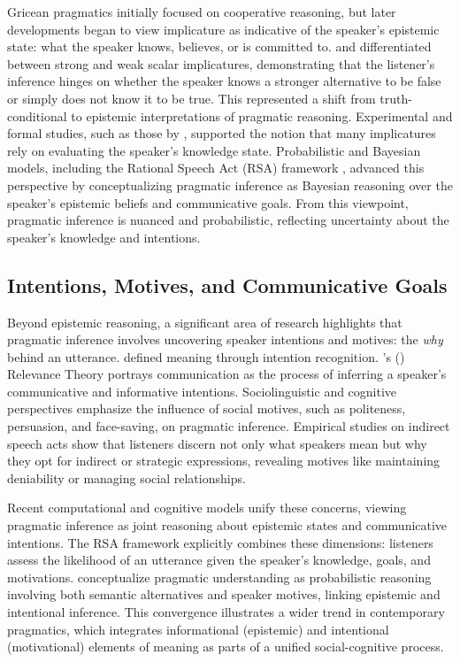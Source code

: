 \documentclass[12pt,a4paper]{article}
\begin{document}
Gricean pragmatics initially focused on cooperative reasoning, but later
developments began to view implicature as indicative of the speaker's epistemic
state: what the speaker knows, believes, or is committed to. \citet{sauerland2004}
and \citet{Spector2007} differentiated between strong and weak scalar
implicatures, demonstrating that the listener's inference hinges on whether the
speaker knows a stronger alternative to be false or simply does not know it to
be true. This represented a shift from truth-conditional to epistemic
interpretations of pragmatic reasoning. Experimental and formal studies, such as
those by \citet{ChemlaSingh2014a}, supported the notion that many implicatures
rely on evaluating the speaker's knowledge state. Probabilistic and Bayesian
models, including the Rational Speech Act (RSA) framework
\citep{frank2012,GoodmanStuhlmuller2013,PottsLassiterLevyFrank2016}, advanced
this perspective by conceptualizing pragmatic inference as Bayesian reasoning
over the speaker's epistemic beliefs and communicative goals. From this
viewpoint, pragmatic inference is nuanced and probabilistic, reflecting
uncertainty about the speaker's knowledge and intentions.

\subsection{Intentions, Motives, and Communicative Goals}

Beyond epistemic reasoning, a significant area of research highlights that
pragmatic inference involves uncovering speaker intentions and motives: the
\emph{why} behind an utterance. \citet{Grice1957} defined meaning through
intention recognition. \citeauthor{SperberWilson1995}'s
(\citeyear{SperberWilson1995}) Relevance Theory portrays communication as the
process of inferring a speaker's communicative and informative intentions.
Sociolinguistic and cognitive perspectives \citep[e.g.,][]{brownlevinson1987,Tomasello2003}
emphasize the influence of social motives, such as politeness, persuasion, and
face-saving, on pragmatic inference. Empirical studies on indirect speech acts
\citep[e.g.,][]{Gibbs1986,LeePinker2010} show that listeners discern not only
what speakers mean but why they opt for indirect or strategic expressions,
revealing motives like maintaining deniability or managing social relationships.

Recent computational and cognitive models unify these concerns, viewing
pragmatic inference as joint reasoning about epistemic states and communicative
intentions. The RSA framework \citep{frank2012,goodman2016} explicitly combines
these dimensions: listeners assess the likelihood of an utterance given the
speaker's knowledge, goals, and motivations. \citet{bergen2016} conceptualize
pragmatic understanding as probabilistic reasoning involving both semantic
alternatives and speaker motives, linking epistemic and intentional inference.
This convergence illustrates a wider trend in contemporary pragmatics, which
integrates informational (epistemic) and intentional (motivational) elements of
meaning as parts of a unified social-cognitive process.
\end{document}
